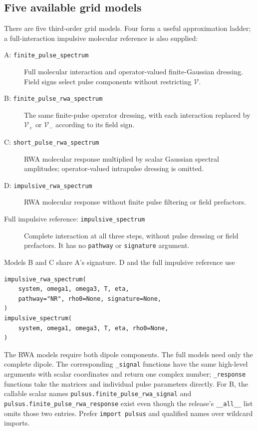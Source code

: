 \subsection{Five available grid models}

There are five third-order grid models. Four form a useful approximation
ladder; a full-interaction impulsive molecular reference is also supplied:
\begin{description}
 \item[A: \texttt{finite\_pulse\_spectrum}]
 Full molecular interaction and operator-valued finite-Gaussian dressing.
 Field signs select pulse components without restricting $\mathcal V$.
 \item[B: \texttt{finite\_pulse\_rwa\_spectrum}]
 The same finite-pulse operator dressing, with each interaction replaced
 by $\mathcal V_+$ or $\mathcal V_-$ according to its field sign.
 \item[C: \texttt{short\_pulse\_rwa\_spectrum}]
 RWA molecular response multiplied by scalar Gaussian spectral
 amplitudes; operator-valued intrapulse dressing is omitted.
 \item[D: \texttt{impulsive\_rwa\_spectrum}]
 RWA molecular response without finite pulse filtering or field
 prefactors.
 \item[Full impulsive reference: \texttt{impulsive\_spectrum}]
 Complete interaction at all three steps, without pulse dressing or
 field prefactors. It has no \texttt{pathway} or \texttt{signature}
 argument.
\end{description}
Models B and C share A's signature. D and the full impulsive reference use
\par\noindent
\begin{minipage}{\linewidth}
\begin{lstlisting}[style=python]
impulsive_rwa_spectrum(
    system, omega1, omega3, T, eta,
    pathway="NR", rho0=None, signature=None,
)
impulsive_spectrum(
    system, omega1, omega3, T, eta, rho0=None,
)
\end{lstlisting}
\end{minipage}\par
The RWA models require both dipole components. The full models need only
the complete dipole. The corresponding \texttt{\_signal} functions have
the same high-level arguments with scalar coordinates and return one
complex number; \texttt{\_response} functions take the matrices and
individual pulse parameters directly. For B, the callable scalar names
\texttt{pulsus.finite\_pulse\_rwa\_signal} and
\texttt{pulsus.finite\_pulse\_rwa\_response} exist even though the
release's \texttt{\_\_all\_\_} list omits those two entries. Prefer
\texttt{import pulsus} and qualified names over wildcard imports.

